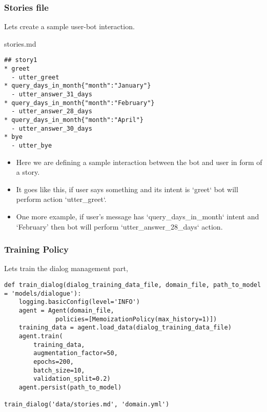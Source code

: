  \begin{frame}[fragile]\frametitle{Stories file}
Lets create a sample user-bot interaction.

stories.md
\begin{lstlisting}
## story1              
* greet              
  - utter_greet
* query_days_in_month{"month":"January"}
  - utter_answer_31_days
* query_days_in_month{"month":"February"}
  - utter_answer_28_days
* query_days_in_month{"month":"April"}
  - utter_answer_30_days
* bye               
  - utter_bye
\end{lstlisting}

\begin{itemize}
\item Here we are defining a sample interaction between the bot and user in form of a story. 
\item It goes like this, if user says something and its intent is ‘greet‘ bot will perform action ‘utter\_greet‘. 
\item One more example, if user’s message has ‘query\_days\_in\_month‘ intent and ‘February’ then bot will perform ‘utter\_answer\_28\_days‘ action.
\end{itemize}
\end{frame}

 \begin{frame}[fragile]\frametitle{Training Policy}
Lets train the dialog management part,

\begin{lstlisting}
def train_dialog(dialog_training_data_file, domain_file, path_to_model = 'models/dialogue'):
    logging.basicConfig(level='INFO')
    agent = Agent(domain_file,
              policies=[MemoizationPolicy(max_history=1)])
    training_data = agent.load_data(dialog_training_data_file)
    agent.train(
        training_data,
        augmentation_factor=50,
        epochs=200,
        batch_size=10,
        validation_split=0.2)
    agent.persist(path_to_model)

train_dialog('data/stories.md', 'domain.yml')
\end{lstlisting}

\end{frame}


